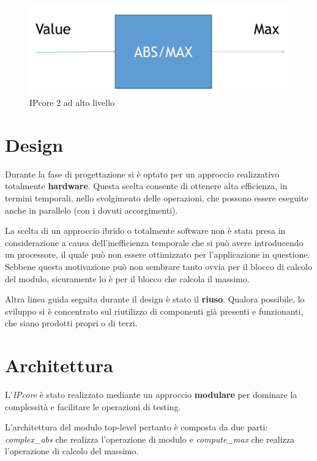 \documentclass[12pt,a4paper,twoside,openany]{book}
\begin{document}
\begin{figure}[hb]
\begin{center}
\includegraphics[scale=0.6, keepaspectratio]{immagini/ipcore2_toplevel}
\caption{IPcore 2 ad alto livello}
\label{ipcore2_top}
\end{center}
\end{figure}
\clearpage

\section{Design}
Durante la fase di progettazione si è optato per un approccio realizzativo totalmente \textbf{hardware}. Questa scelta consente di ottenere alta efficienza, in termini temporali, nello svolgimento delle operazioni, che possono essere eseguite anche in parallelo (con i dovuti accorgimenti). 

La scelta di un approccio ibrido o totalmente software non è stata presa in considerazione a causa dell'inefficienza temporale che si può avere introducendo un processore, il quale può non essere ottimizzato per l'applicazione in questione. Sebbene questa motivazione può non sembrare tanto ovvia per il blocco di calcolo del modulo, sicuramente lo è per il blocco che calcola il massimo.

Altra linea guida seguita durante il design è stato il \textbf{riuso}. Qualora possibile, lo sviluppo si è concentrato sul riutilizzo di componenti già presenti e funzionanti, che siano prodotti propri o di terzi.
\section{Architettura}
L'\textit{IPcore} è stato realizzato mediante un approccio \textbf{modulare} per dominare la complessità e facilitare le operazioni di testing.

L'architettura del modulo top-level pertanto è composta da due parti: \textit{complex\_abs} che realizza l'operazione di modulo e \textit{compute\_max} che realizza l'operazione di calcolo del massimo.
\end{document}
